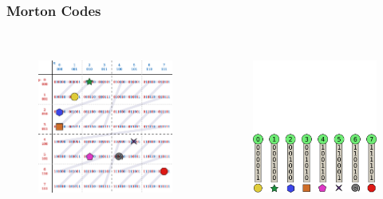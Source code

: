 \documentclass{beamer}
\begin{document}
\begin{frame}
  \frametitle{Morton Codes}
  
\begin{columns}[t]

\begin{figure}
\includegraphics[height=55mm]{Z-curve-primitives.png}
\end{figure}

\begin{figure}
\includegraphics[height=55mm]{keys_7.png}
\end{figure}
\end{columns}
\end{frame}
\end{document}
